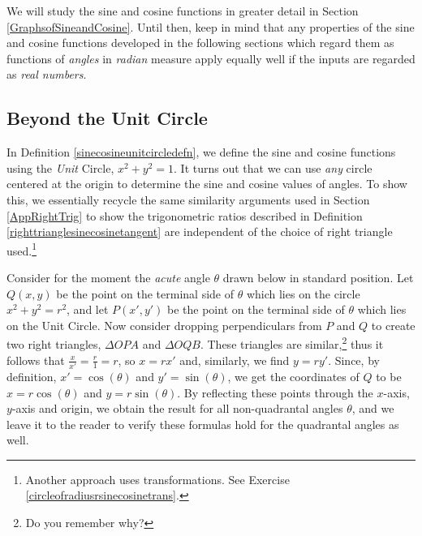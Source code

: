 \documentclass{ximera}
\begin{document}
\smallskip

We will study the sine and cosine functions in greater detail in Section \ref{GraphsofSineandCosine}.  Until then, keep in mind that any properties of the sine and cosine functions developed in the following sections which regard them as functions of \textit{angles} in \textit{radian} measure apply equally well if the inputs are regarded as \textit{real numbers}.


\smallskip

\subsection{Beyond the Unit Circle}
\label{cosinesinebeyond}

In Definition \ref{sinecosineunitcircledefn}, we define the sine and cosine functions using the \textit{Unit} Circle, $x^2+y^2=1$.   It turns out that we can use \textit{any} circle centered at the origin to determine the sine and cosine values of angles.  To show this,  we essentially recycle the same similarity arguments used in Section \ref{AppRightTrig} to show the trigonometric ratios described in Definition \ref{righttrianglesinecosinetangent} are independent of the choice of right triangle used.\footnote{Another approach uses transformations.  See Exercise \ref{circleofradiusrsinecosinetrans}.}

\smallskip

Consider for the moment the \textit{acute} angle $\theta$ drawn below in standard position.  Let $Q(x,y)$ be the point on the terminal side of $\theta$ which lies on the circle $x^2+y^2 = r^2$, and let $P(x',y')$ be the point on the terminal side of $\theta$ which lies on the Unit Circle.   Now consider dropping perpendiculars from $P$ and $Q$ to create two right triangles, $\Delta OPA$ and $\Delta OQB$. These triangles are similar,\footnote{Do you remember why?} thus it follows that $\frac{x}{x'} = \frac{r}{1} = r$, so $x = r x'$ and, similarly, we find $y = r y'$.  Since, by definition, $x' = \cos(\theta)$ and $y' = \sin(\theta)$,  we get the coordinates of $Q$ to be $x = r \cos(\theta)$ and $y = r \sin(\theta)$.  By reflecting these points through the $x$-axis, $y$-axis and origin, we obtain the result for all non-quadrantal angles $\theta$, and we leave it to the reader to verify these formulas hold for the quadrantal angles as well.
\end{document}
